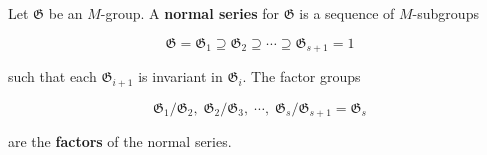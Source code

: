 Let $\mathfrak{G}$ be an $M$-group. A \textbf{normal series} for $\mathfrak{G}$ is a sequence of $M$-subgroups

$$\mathfrak{G} = \mathfrak{G}_1 \supseteq \mathfrak{G}_2 \supseteq \cdots \supseteq \mathfrak{G}_{s+1} = 1$$

such that each $\mathfrak{G}_{i+1}$ is invariant in $\mathfrak{G}_i$. The factor groups

$$\mathfrak{G}_1/\mathfrak{G}_2,\; \mathfrak{G}_2/\mathfrak{G}_3,\; \cdots,\; \mathfrak{G}_s/\mathfrak{G}_{s+1} = \mathfrak{G}_s$$

are the \textbf{factors} of the normal series.
